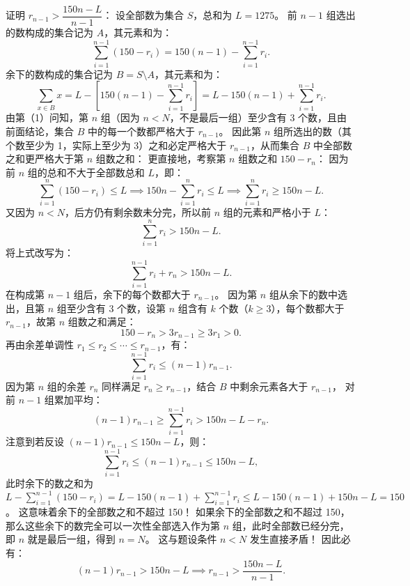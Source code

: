 \begin{answer}
证明 $r_{n-1}>\dfrac{150n-L}{n-1}$：
设全部数为集合 $S$，总和为 $L=1275$。
前 $n-1$ 组选出的数构成的集合记为 $A$，其元素和为：
\nopagebreak[4]
\[
\sum_{i=1}^{n-1} (150-r_i)=150(n-1)-\sum_{i=1}^{n-1} r_i.
\]
余下的数构成的集合记为 $B=S\setminus A$，其元素和为：
\nopagebreak[4]
\[
\sum_{x\in B} x=L-\left[150(n-1)-\sum_{i=1}^{n-1} r_i\right]=L-150(n-1)+\sum_{i=1}^{n-1} r_i.
\]
由第（1）问知，第 $n$ 组（因为 $n<N$，不是最后一组）至少含有 3 个数，且由前面结论，集合 $B$ 中的每一个数都严格大于 $r_{n-1}$。
因此第 $n$ 组所选出的数（其个数至少为 1，实际上至少为 3）之和必定严格大于 $r_{n-1}$，从而集合 $B$ 中全部数之和更严格大于第 $n$ 组数之和：
更直接地，考察第 $n$ 组数之和 $150-r_n$：
因为前 $n$ 组的总和不大于全部数总和 $L$，即：
\nopagebreak[4]
\[
\sum_{i=1}^n (150-r_i)\le L \implies 150n-\sum_{i=1}^n r_i\le L \implies \sum_{i=1}^n r_i\ge 150n-L.
\]
又因为 $n<N$，后方仍有剩余数未分完，所以前 $n$ 组的元素和严格小于 $L$：
\nopagebreak[4]
\[
\sum_{i=1}^n r_i>150n-L.
\]
将上式改写为：
\nopagebreak[4]
\[
\sum_{i=1}^{n-1} r_i+r_n>150n-L.
\]
在构成第 $n-1$ 组后，余下的每个数都大于 $r_{n-1}$。
因为第 $n$ 组从余下的数中选出，且第 $n$ 组至少含有 3 个数，设第 $n$ 组含有 $k$ 个数（$k\ge 3$），每个数都大于 $r_{n-1}$，故第 $n$ 组数之和满足：
\nopagebreak[4]
\[
150-r_n>3r_{n-1}\ge 3r_1>0.
\]
再由余差单调性 $r_1\le r_2\le \cdots\le r_{n-1}$，有：
\nopagebreak[4]
\[
\sum_{i=1}^{n-1} r_i\le (n-1)r_{n-1}.
\]
因为第 $n$ 组的余差 $r_n$ 同样满足 $r_n\ge r_{n-1}$，结合 $B$ 中剩余元素各大于 $r_{n-1}$，
对前 $n-1$ 组累加平均：
\nopagebreak[4]
\[
(n-1)r_{n-1}\ge \sum_{i=1}^{n-1} r_i>150n-L-r_n.
\]
注意到若反设 $(n-1)r_{n-1}\le 150n-L$，则：
\nopagebreak[4]
\[
\sum_{i=1}^{n-1} r_i\le (n-1)r_{n-1}\le 150n-L,
\]
此时余下的数之和为 $L-\sum_{i=1}^{n-1}(150-r_i)=L-150(n-1)+\sum_{i=1}^{n-1} r_i\le L-150(n-1)+150n-L=150$。
这意味着余下的全部数之和不超过 150！
如果余下的全部数之和不超过 150，那么这些余下的数完全可以一次性全部选入作为第 $n$ 组，此时全部数已经分完，即 $n$ 就是最后一组，得到 $n=N$。
这与题设条件 $n<N$ 发生直接矛盾！
因此必有：
\nopagebreak[4]
\[
(n-1)r_{n-1}>150n-L\implies r_{n-1}>\frac{150n-L}{n-1}.
\]


\end{answer}
